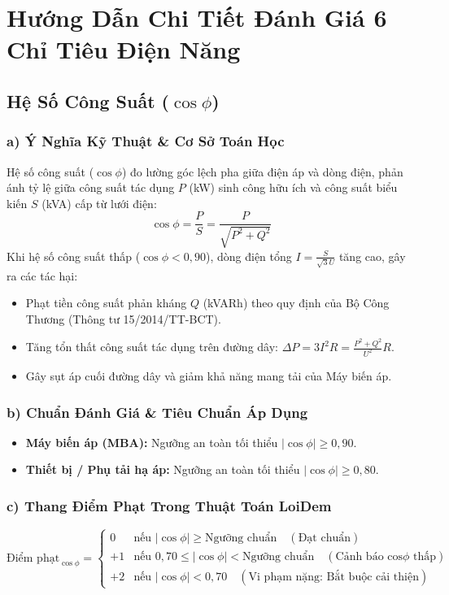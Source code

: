 \documentclass[12pt,a4paper]{article}
\begin{document}
\clearpage
\section{Hướng Dẫn Chi Tiết Đánh Giá 6 Chỉ Tiêu Điện Năng}

\subsection{\texorpdfstring{Hệ Số Công Suất ($\cos\phi$)}{Hệ Số Công Suất (cos phi)}}

\subsubsection{a) Ý Nghĩa Kỹ Thuật \& Cơ Sở Toán Học}
Hệ số công suất ($\cos\phi$) đo lường góc lệch pha giữa điện áp và dòng điện, phản ánh tỷ lệ giữa công suất tác dụng $P$ (kW) sinh công hữu ích và công suất biểu kiến $S$ (kVA) cấp từ lưới điện:
\begin{equation}
  \cos\phi = \frac{P}{S} = \frac{P}{\sqrt{P^2 + Q^2}}
\end{equation}
Khi hệ số công suất thấp ($\cos\phi < 0{,}90$), dòng điện tổng $I = \frac{S}{\sqrt{3}U}$ tăng cao, gây ra các tác hại:
\begin{itemize}
  \item Phạt tiền công suất phản kháng $Q$ (kVARh) theo quy định của Bộ Công Thương (Thông tư 15/2014/TT-BCT).
  \item Tăng tổn thất công suất tác dụng trên đường dây: $\Delta P = 3 I^2 R = \frac{P^2 + Q^2}{U^2} R$.
  \item Gây sụt áp cuối đường dây và giảm khả năng mang tải của Máy biến áp.
\end{itemize}

\subsubsection{b) Chuẩn Đánh Giá \& Tiêu Chuẩn Áp Dụng}
\begin{itemize}
  \item \textbf{Máy biến áp (MBA):} Ngưỡng an toàn tối thiểu $|\cos\phi| \ge 0{,}90$.
  \item \textbf{Thiết bị / Phụ tải hạ áp:} Ngưỡng an toàn tối thiểu $|\cos\phi| \ge 0{,}80$.
\end{itemize}

\subsubsection{c) Thang Điểm Phạt Trong Thuật Toán LoiDem}
\begin{equation}
  \text{Điểm phạt}_{\cos\phi} = 
  \begin{cases} 
    0 & \text{nếu } |\cos\phi| \ge \text{Ngưỡng chuẩn} \quad (\text{Đạt chuẩn}) \\
    +1 & \text{nếu } 0{,}70 \le |\cos\phi| < \text{Ngưỡng chuẩn} \quad (\text{Cảnh báo cos}\phi \text{ thấp}) \\
    +2 & \text{nếu } |\cos\phi| < 0{,}70 \quad (\text{Vi phạm nặng: Bắt buộc cải thiện})
  \end{cases}
\end{equation}
\end{document}
